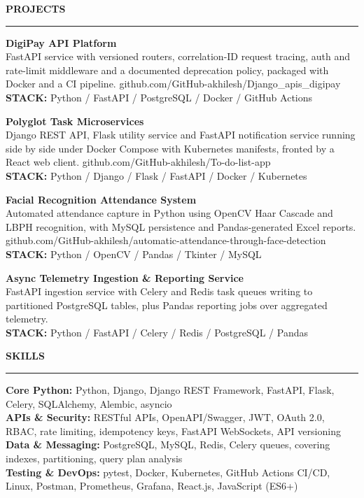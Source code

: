 \documentclass[10pt]{article}
\newcommand{\resumesection}[1]{%
  \vspace{6pt}%
  {\fontfamily{phv}\selectfont\textbf{\large\MakeUppercase{#1}}}%
  \vspace{2pt}%
  \hrule%
  \vspace{4pt}%
}
\begin{document}
\resumesection{Projects}
{\textbf{DigiPay API Platform}} \\
{\small FastAPI service with versioned routers, correlation-ID request tracing, auth and rate-limit middleware and a documented deprecation policy, packaged with Docker and a CI pipeline. github.com/GitHub-akhilesh/Django\_apis\_digipay} \\
{\footnotesize\textbf{STACK:} Python / FastAPI / PostgreSQL / Docker / GitHub Actions}

\vspace{4pt}
{\textbf{Polyglot Task Microservices}} \\
{\small Django REST API, Flask utility service and FastAPI notification service running side by side under Docker Compose with Kubernetes manifests, fronted by a React web client. github.com/GitHub-akhilesh/To-do-list-app} \\
{\footnotesize\textbf{STACK:} Python / Django / Flask / FastAPI / Docker / Kubernetes}

\vspace{4pt}
{\textbf{Facial Recognition Attendance System}} \\
{\small Automated attendance capture in Python using OpenCV Haar Cascade and LBPH recognition, with MySQL persistence and Pandas-generated Excel reports. github.com/GitHub-akhilesh/automatic-attendance-through-face-detection} \\
{\footnotesize\textbf{STACK:} Python / OpenCV / Pandas / Tkinter / MySQL}

\vspace{4pt}
{\textbf{Async Telemetry Ingestion \& Reporting Service}} \\
{\small FastAPI ingestion service with Celery and Redis task queues writing to partitioned PostgreSQL tables, plus Pandas reporting jobs over aggregated telemetry.} \\
{\footnotesize\textbf{STACK:} Python / FastAPI / Celery / Redis / PostgreSQL / Pandas}

\resumesection{Skills}
\textbf{Core Python:} Python, Django, Django REST Framework, FastAPI, Flask, Celery, SQLAlchemy, Alembic, asyncio \\
\textbf{APIs \& Security:} RESTful APIs, OpenAPI/Swagger, JWT, OAuth 2.0, RBAC, rate limiting, idempotency keys, FastAPI WebSockets, API versioning \\
\textbf{Data \& Messaging:} PostgreSQL, MySQL, Redis, Celery queues, covering indexes, partitioning, query plan analysis \\
\textbf{Testing \& DevOps:} pytest, Docker, Kubernetes, GitHub Actions CI/CD, Linux, Postman, Prometheus, Grafana, React.js, JavaScript (ES6+)
\end{document}
